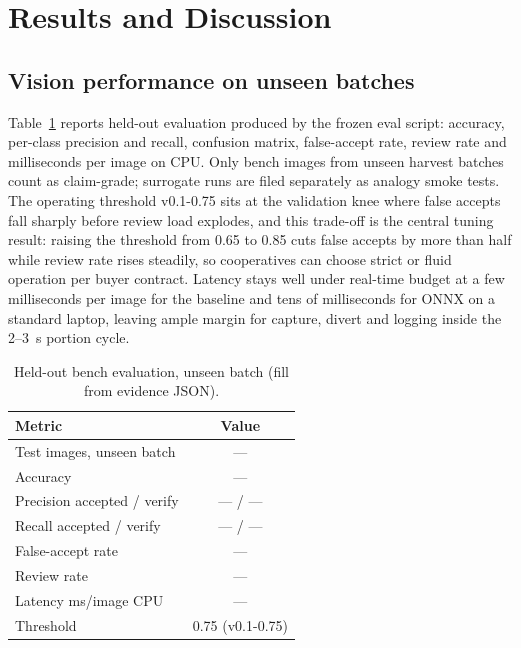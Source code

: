 \documentclass[10pt,conference,a4paper]{IEEEtran}
\begin{document}
\section{Results and Discussion}
\subsection{Vision performance on unseen batches}
Table~\ref{tab:eval} reports held-out evaluation produced by the frozen eval script: accuracy, per-class precision and recall, confusion matrix, false-accept rate, review rate and milliseconds per image on CPU. Only bench images from unseen harvest batches count as claim-grade; surrogate runs are filed separately as analogy smoke tests. The operating threshold v0.1-0.75 sits at the validation knee where false accepts fall sharply before review load explodes, and this trade-off is the central tuning result: raising the threshold from 0.65 to 0.85 cuts false accepts by more than half while review rate rises steadily, so cooperatives can choose strict or fluid operation per buyer contract. Latency stays well under real-time budget at a few milliseconds per image for the baseline and tens of milliseconds for ONNX on a standard laptop, leaving ample margin for capture, divert and logging inside the 2--3~s portion cycle.
\begin{table}[htbp]
\caption{Held-out bench evaluation, unseen batch (fill from evidence JSON).}
\label{tab:eval}
\centering
\begin{tabular}{@{}lc@{}}
\toprule
Metric & Value \\
\midrule
Test images, unseen batch & --- \\
Accuracy & --- \\
Precision accepted / verify & --- / --- \\
Recall accepted / verify & --- / --- \\
False-accept rate & --- \\
Review rate & --- \\
Latency ms/image CPU & --- \\
Threshold & 0.75 (v0.1-0.75) \\
\bottomrule
\end{tabular}
\end{table}
\end{document}
